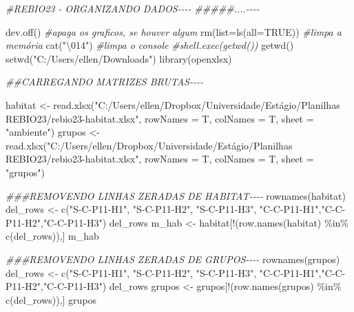 \documentclass[
  letterpaper,
  DIV=11,
  numbers=noendperiod]{scrartcl}
\newenvironment{Shaded}{}{}
\newcommand{\AttributeTok}[1]{\textcolor[rgb]{0.49,0.56,0.16}{#1}}
\newcommand{\CommentTok}[1]{\textcolor[rgb]{0.38,0.63,0.69}{\textit{#1}}}
\newcommand{\ConstantTok}[1]{\textcolor[rgb]{0.53,0.00,0.00}{#1}}
\newcommand{\DocumentationTok}[1]{\textcolor[rgb]{0.73,0.13,0.13}{\textit{#1}}}
\newcommand{\FunctionTok}[1]{\textcolor[rgb]{0.02,0.16,0.49}{#1}}
\newcommand{\NormalTok}[1]{#1}
\newcommand{\OtherTok}[1]{\textcolor[rgb]{0.00,0.44,0.13}{#1}}
\newcommand{\SpecialCharTok}[1]{\textcolor[rgb]{0.25,0.44,0.63}{#1}}
\newcommand{\StringTok}[1]{\textcolor[rgb]{0.25,0.44,0.63}{#1}}
\begin{document}
\begin{Shaded}
\begin{Highlighting}[numbers=left,,]
\CommentTok{\#REBIO23 {-} ORGANIZANDO DADOS{-}{-}{-}{-}}
\DocumentationTok{\#\#\#\#\#....{-}{-}{-}{-}}

\FunctionTok{dev.off}\NormalTok{() }\CommentTok{\#apaga os graficos, se houver algum}
\FunctionTok{rm}\NormalTok{(}\AttributeTok{list=}\FunctionTok{ls}\NormalTok{(}\AttributeTok{all=}\ConstantTok{TRUE}\NormalTok{)) }\CommentTok{\#limpa a memória}
\FunctionTok{cat}\NormalTok{(}\StringTok{"}\SpecialCharTok{\textbackslash{}014}\StringTok{"}\NormalTok{) }\CommentTok{\#limpa o console}
\CommentTok{\#shell.exec(getwd())}
\FunctionTok{getwd}\NormalTok{()}
\FunctionTok{setwd}\NormalTok{(}\StringTok{"C:/Users/ellen/Downloads"}\NormalTok{)}
\FunctionTok{library}\NormalTok{(openxlsx)}

\DocumentationTok{\#\#CARREGANDO MATRIZES BRUTAS{-}{-}{-}{-}}

\NormalTok{habitat }\OtherTok{\textless{}{-}} \FunctionTok{read.xlsx}\NormalTok{(}\StringTok{"C:/Users/ellen/Dropbox/Universidade/Estágio/Planilhas REBIO23/rebio23{-}habitat.xlsx"}\NormalTok{,}
                    \AttributeTok{rowNames =}\NormalTok{ T,}
                    \AttributeTok{colNames =}\NormalTok{ T,}
                    \AttributeTok{sheet =} \StringTok{"ambiente"}\NormalTok{)}
\NormalTok{grupos }\OtherTok{\textless{}{-}} \FunctionTok{read.xlsx}\NormalTok{(}\StringTok{"C:/Users/ellen/Dropbox/Universidade/Estágio/Planilhas REBIO23/rebio23{-}habitat.xlsx"}\NormalTok{,}
                   \AttributeTok{rowNames =}\NormalTok{ T,}
                   \AttributeTok{colNames =}\NormalTok{ T,}
                   \AttributeTok{sheet =} \StringTok{"grupos"}\NormalTok{)}

\DocumentationTok{\#\#\#REMOVENDO LINHAS ZERADAS DE HABITAT{-}{-}{-}{-}}
\FunctionTok{rownames}\NormalTok{(habitat)}
\NormalTok{del\_rows }\OtherTok{\textless{}{-}} \FunctionTok{c}\NormalTok{(}\StringTok{"S{-}C{-}P11{-}H1"}\NormalTok{, }\StringTok{"S{-}C{-}P11{-}H2"}\NormalTok{, }\StringTok{"S{-}C{-}P11{-}H3"}\NormalTok{, }\StringTok{"C{-}C{-}P11{-}H1"}\NormalTok{,}\StringTok{"C{-}C{-}P11{-}H2"}\NormalTok{,}\StringTok{"C{-}C{-}P11{-}H3"}\NormalTok{)}
\NormalTok{del\_rows}
\NormalTok{m\_hab }\OtherTok{\textless{}{-}}\NormalTok{ habitat[}\SpecialCharTok{!}\NormalTok{(}\FunctionTok{row.names}\NormalTok{(habitat) }\SpecialCharTok{\%in\%} \FunctionTok{c}\NormalTok{(del\_rows)),]}
\NormalTok{m\_hab}

\DocumentationTok{\#\#\#REMOVENDO LINHAS ZERADAS DE GRUPOS{-}{-}{-}{-}}
\FunctionTok{rownames}\NormalTok{(grupos)}
\NormalTok{del\_rows }\OtherTok{\textless{}{-}} \FunctionTok{c}\NormalTok{(}\StringTok{"S{-}C{-}P11{-}H1"}\NormalTok{, }\StringTok{"S{-}C{-}P11{-}H2"}\NormalTok{, }\StringTok{"S{-}C{-}P11{-}H3"}\NormalTok{, }\StringTok{"C{-}C{-}P11{-}H1"}\NormalTok{,}\StringTok{"C{-}C{-}P11{-}H2"}\NormalTok{,}\StringTok{"C{-}C{-}P11{-}H3"}\NormalTok{)}
\NormalTok{del\_rows}
\NormalTok{grupos }\OtherTok{\textless{}{-}}\NormalTok{ grupos[}\SpecialCharTok{!}\NormalTok{(}\FunctionTok{row.names}\NormalTok{(grupos) }\SpecialCharTok{\%in\%} \FunctionTok{c}\NormalTok{(del\_rows)),]}
\NormalTok{grupos}


\end{Highlighting}
\end{Shaded}
\end{document}
